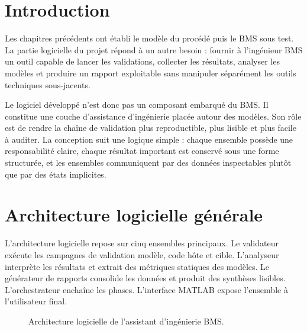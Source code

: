 \label{chap:partie_logicielle}

\section{Introduction}
\label{sec:ch5_introduction}

Les chapitres précédents ont établi le modèle du procédé puis le BMS sous test. La partie logicielle du projet répond à un autre besoin : fournir à l'ingénieur BMS un outil capable de lancer les validations, collecter les résultats, analyser les modèles et produire un rapport exploitable sans manipuler séparément les outils techniques sous-jacents.

\noindent
Le logiciel développé n'est donc pas un composant embarqué du BMS. Il constitue une couche d'assistance d'ingénierie placée autour des modèles. Son rôle est de rendre la chaîne de validation plus reproductible, plus lisible et plus facile à auditer. La conception suit une logique simple : chaque ensemble possède une responsabilité claire, chaque résultat important est conservé sous une forme structurée, et les ensembles communiquent par des données inspectables plutôt que par des états implicites.

\section{Architecture logicielle générale}
\label{sec:ch5_architecture}

L'architecture logicielle repose sur cinq ensembles principaux. Le validateur exécute les campagnes de validation modèle, code hôte et cible. L'analyseur interprète les résultats et extrait des métriques statiques des modèles. Le générateur de rapports consolide les données et produit des synthèses lisibles. L'orchestrateur enchaîne les phases. L'interface MATLAB expose l'ensemble à l'utilisateur final.

\begin{figure}[H]
  \centering
  \captionsetup{width=0.84\textwidth, skip=15pt}
  \caption{Architecture logicielle de l'assistant d'ingénierie BMS.}
  \label{fig:ch5_architecture_logicielle}
\end{figure}


